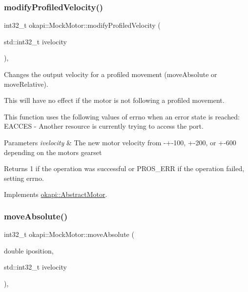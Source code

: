 \subsubsection{\texorpdfstring{modifyProfiledVelocity()}{modifyProfiledVelocity()}}
{\footnotesize\ttfamily int32\+\_\+t okapi\+::\+Mock\+Motor\+::modify\+Profiled\+Velocity (\begin{DoxyParamCaption}\item[{std\+::int32\+\_\+t}]{ivelocity }\end{DoxyParamCaption})\hspace{0.3cm}{\ttfamily [override]}, {\ttfamily [virtual]}}



Changes the output velocity for a profiled movement (move\+Absolute or move\+Relative). 

This will have no effect if the motor is not following a profiled movement.

This function uses the following values of errno when an error state is reached\+: E\+A\+C\+C\+ES -\/ Another resource is currently trying to access the port.


\begin{DoxyParams}{Parameters}
{\em ivelocity} & The new motor velocity from -\/+-\/100, +-\/200, or +-\/600 depending on the motor\textquotesingle{}s gearset \\
\hline
\end{DoxyParams}
\begin{DoxyReturn}{Returns}
1 if the operation was successful or P\+R\+O\+S\+\_\+\+E\+RR if the operation failed, setting errno. 
\end{DoxyReturn}


Implements \mbox{\hyperlink{classokapi_1_1AbstractMotor_a1d131cbf0b8a325a54034e540c3be6d2}{okapi\+::\+Abstract\+Motor}}.

\mbox{\label{classokapi_1_1MockMotor_aa9535abddff7389f066099b5fe5b9651}} 
\subsubsection{\texorpdfstring{moveAbsolute()}{moveAbsolute()}}
{\footnotesize\ttfamily int32\+\_\+t okapi\+::\+Mock\+Motor\+::move\+Absolute (\begin{DoxyParamCaption}\item[{double}]{iposition,  }\item[{std\+::int32\+\_\+t}]{ivelocity }\end{DoxyParamCaption})\hspace{0.3cm}{\ttfamily [override]}, {\ttfamily [virtual]}}




